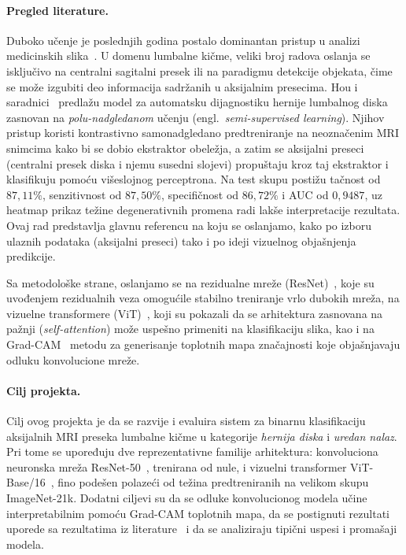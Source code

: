 \documentclass[12pt,a4paper]{article}
\begin{document}
\paragraph{Pregled literature.}
Duboko učenje je poslednjih godina postalo dominantan pristup u analizi medicinskih
slika~\cite{litjens2017survey}. U domenu lumbalne kičme, veliki broj radova oslanja se
isključivo na centralni sagitalni presek ili na paradigmu detekcije objekata, čime se
može izgubiti deo informacija sadržanih u aksijalnim presecima. Hou i saradnici~\cite{hou2023mri}
predlažu model za automatsku dijagnostiku hernije lumbalnog diska zasnovan na
\textit{polu-nadgledanom} učenju (engl.\ \textit{semi-supervised learning}). Njihov
pristup koristi kontrastivno samonadgledano predtreniranje na neoznačenim MRI snimcima
kako bi se dobio ekstraktor obeležja, a zatim se aksijalni preseci (centralni presek
diska i njemu susedni slojevi) propuštaju kroz taj ekstraktor i klasifikuju pomoću
višeslojnog perceptrona. Na test skupu postižu tačnost od $87{,}11\%$, senzitivnost od
$87{,}50\%$, specifičnost od $86{,}72\%$ i AUC od $0{,}9487$, uz heatmap prikaz težine
degenerativnih promena radi lakše interpretacije rezultata. Ovaj rad predstavlja glavnu
referencu na koju se oslanjamo, kako po izboru ulaznih podataka (aksijalni preseci) tako
i po ideji vizuelnog objašnjenja predikcije.

Sa metodološke strane, oslanjamo se na rezidualne mreže (ResNet)~\cite{he2016deep}, koje
su uvođenjem rezidualnih veza omogućile stabilno treniranje vrlo dubokih mreža, na
vizuelne transformere (ViT)~\cite{dosovitskiy2021vit}, koji su pokazali da se
arhitektura zasnovana na pažnji (\textit{self-attention}) može uspešno primeniti na
klasifikaciju slika, kao i na Grad-CAM~\cite{selvaraju2017gradcam} metodu za generisanje
toplotnih mapa značajnosti koje objašnjavaju odluku konvolucione mreže.

\paragraph{Cilj projekta.}
Cilj ovog projekta je da se razvije i evaluira sistem za binarnu klasifikaciju aksijalnih
MRI preseka lumbalne kičme u kategorije \textit{hernija diska} i \textit{uredan nalaz}.
Pri tome se upoređuju dve reprezentativne familije arhitektura: konvoluciona neuronska
mreža ResNet-50~\cite{he2016deep}, trenirana od nule, i vizuelni transformer
ViT-Base/16~\cite{dosovitskiy2021vit}, fino podešen polazeći od težina predtreniranih na
velikom skupu ImageNet-21k. Dodatni ciljevi su da se odluke konvolucionog modela učine
interpretabilnim pomoću Grad-CAM toplotnih mapa, da se postignuti rezultati uporede sa
rezultatima iz literature~\cite{hou2023mri} i da se analiziraju tipični uspesi i promašaji
modela.
\end{document}
